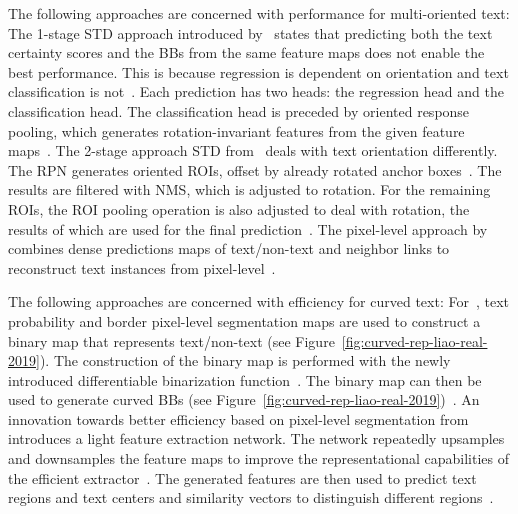 The following approaches are concerned with performance for multi-oriented text:
The 1-stage \ac{STD} approach introduced by~\cite{liao_rotation-sensitive_2018} states that
predicting both the text certainty scores and the \acp{BB} from the same feature maps does not
enable the best performance.
This is because regression is dependent on orientation and text classification is
not~\citep{liao_rotation-sensitive_2018}.
Each prediction has two heads: the regression head and the classification head.
The classification head is preceded by oriented response pooling, which generates rotation-invariant
features from the given feature maps~\citep{liao_rotation-sensitive_2018}.
The 2-stage approach \ac{STD} from~\cite{ma_arbitrary-oriented_2018} deals with text orientation
differently.
The \ac{RPN} generates oriented \acp{ROI}, offset by already rotated anchor
boxes~\citep{ma_arbitrary-oriented_2018}.
The results are filtered with \ac{NMS}, which is adjusted to rotation.
For the remaining \acp{ROI}, the \ac{ROI} pooling operation is also adjusted to deal with rotation,
the results of which are used for the final prediction~\citep{ma_arbitrary-oriented_2018}.
The pixel-level approach by~\cite{deng_pixellink_2018} combines dense predictions maps of
text/non-text and neighbor links to reconstruct text instances
from pixel-level~\citep{deng_pixellink_2018}.

The following approaches are concerned with efficiency for curved text:
For~\cite{liao_real-time_2019}, text probability and border pixel-level segmentation maps are used
to construct a binary map that represents text/non-text (see
Figure~\ref{fig:curved-rep-liao-real-2019}).
The construction of the binary map is performed with the newly introduced differentiable binarization
function~\citep{liao_real-time_2019}.
The binary map can then be used to generate curved \acp{BB} (see
Figure~\ref{fig:curved-rep-liao-real-2019})~\citep{liao_real-time_2019}.
An innovation towards better efficiency based on pixel-level segmentation
from~\cite{wang_efficient_2019} introduces a light feature extraction network.
The network repeatedly upsamples and downsamples the feature maps to improve the representational
capabilities of the efficient extractor~\citep{wang_efficient_2019}.
The generated features are then used to predict text regions and text centers and similarity
vectors to distinguish different regions~\citep{wang_efficient_2019}.

